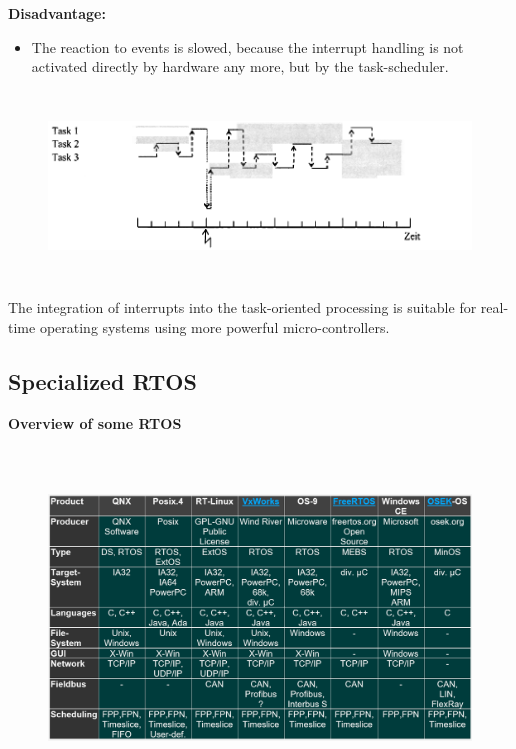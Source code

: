 \textbf{Disadvantage: } 

\begin{itemize}
	\item The reaction to events is slowed, because the interrupt handling is not activated   directly by hardware any more, but by the task-scheduler.
\end{itemize} 

 	\begin{figure}[h]
    \centering
    \includegraphics[width=14cm, height=5cm]{Images/image23.png}
    \label{fig:Fig }
    \end{figure}

The integration of interrupts into the task-oriented processing is suitable for real-time operating systems using more powerful micro-controllers.
\newpage

\subsection{Specialized RTOS}

{\rot\bf Overview of some RTOS}

 	\begin{figure}[h]
    \centering
    \includegraphics[width=15cm, height=9cm]{Images/image127.png}
    \label{fig:Fig }
    \end{figure}


